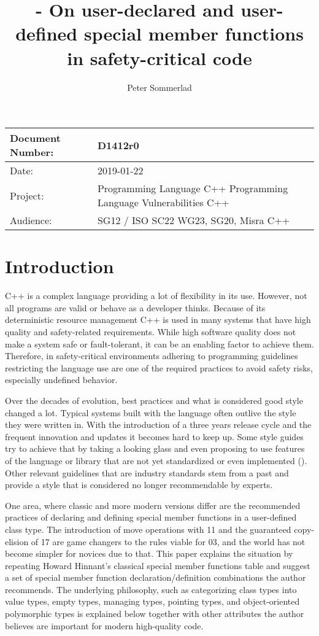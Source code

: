 \documentclass[ebook,11pt,article]{memoir}
\title{\papernumber{} - On user-declared and user-defined special member functions in safety-critical code}
\author{Peter Sommerlad}
\date{\paperdate}                %
\newcommand{\papernumber}{D1412r0}
\newcommand{\paperdate}{2019-01-22}
\begin{document}
\maketitle
\begin{center}
\begin{tabular}[t]{|l|p{8cm}|}\hline 
Document Number:&  \papernumber \\\hline
Date: & \paperdate \\\hline
Project: & Programming Language C++ \newline Programming Language Vulnerabilities C++\\\hline 
Audience: & SG12 / ISO SC22 WG23, SG20, Misra C++\\\hline
\end{tabular}
\end{center}
\chapter{Introduction}

C++ is a complex language providing a lot of flexibility in its use. However, not all programs are valid or behave as a developer thinks. Because of its deterministic resource management C++ is used in many systems that have high quality and safety-related requirements. While high software quality does not make a system safe or fault-tolerant, it can be an enabling factor to achieve them. Therefore, in safety-critical environments adhering to programming guidelines restricting the language use are one of the required practices to avoid safety risks, especially undefined behavior.

Over the decades of \Cpp{} evolution, best practices and what is considered good style changed a lot. Typical systems built with the language often outlive the style they were written in. With the introduction of a three years release cycle and the frequent innovation and updates it becomes hard to keep up. Some style guides try to achieve that by taking a looking glass and even proposing to use features of the language or library that are not yet standardized or even implemented (\cite{CppCGL}). Other relevant guidelines that are industry standards stem from a past and provide a style that is considered no longer recommendable by \Cpp{} experts.

One area, where classic and more modern \Cpp{} versions differ are the recommended practices of declaring and defining special member functions in a user-defined class type. The introduction of move operations with \Cpp{}11 and the guaranteed copy-elision of \Cpp{}17 are game changers to the rules viable for \Cpp{}03, and the world has not become simpler for novices due to that. This paper explains the situation by repeating Howard Hinnant's classical special member functions table\cite{ACCU2014} and suggest a set of special member function declaration/definition combinations the author recommends. The underlying philosophy, such as categorizing class types into value types, empty types, managing types, pointing types, and object-oriented polymorphic types is explained below together with other attributes the author believes are important for modern high-quality \Cpp{} code.
\end{document}

